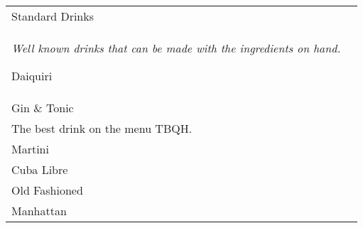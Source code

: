 \documentclass[12pt]{article}
\makeatletter
\newcommand*\ColText[1]{\textcolor{DarkColor}{#1}}
\newenvironment{Group}[1]
  {\noindent\begin{tabular*}{\textwidth}{@{}p{.8\linewidth}@{\extracolsep{\fill}}r@{}}
    {\fontsize{24}{29}\selectfont\ColText{#1}}\\[0.8em]}
  {\end{tabular*}}
\newcommand*\Entry[1]{%
  \sffamily#1 \\
}
\newcommand*\Expl[1]{
  \hspace*{1em}\footnotesize #1 \\
}
\newcommand*\HowTo[1]{
  \hspace*{1em}\footnotesize How to: \hspace*{1em}#1 \\
}
\makeatother
\begin{document}
\vfill

\begin{Group}{Standard Drinks}
\emph{Well known drinks that can be made with the ingredients on hand.}


\Entry{Daiquiri}
\Entry{Gin \& Tonic}
\Expl{The best drink on the menu TBQH.}
\Entry{Martini}
\Entry{Cuba Libre}
\Entry{Old Fashioned}
\Entry{Manhattan}

\end{Group}
\end{document}
